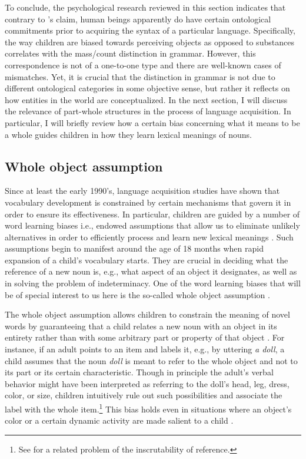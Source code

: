 To conclude, the psychological research reviewed in this section indicates that contrary to \citeauthor{quine1960word}'s claim, human beings apparently do have certain ontological commitments prior to acquiring the syntax of a particular language. Specifically, the way children are biased towards perceiving objects as opposed to substances correlates with the mass/count distinction in grammar. However, this correspondence is not of a one-to-one  type and there are well-known cases of mismatches. Yet, it is crucial that the distinction in grammar is not due to different ontological categories in some objective sense, but rather it reflects on how entities in the world are conceptualized. In the next section, I will discuss the relevance of part-whole structures in the process of language acquisition. In particular, I will briefly review how a certain bias concerning what it means to be a whole guides children in how they learn lexical meanings of nouns. 

\subsection{Whole object assumption}\label{sec:whole-object-assumption}

Since at least the early 1990's, language acquisition studies have shown that vocabulary development is constrained by certain mechanisms that govern it in order to ensure its effectiveness. In particular, children are guided by a number of word learning biases i.e., endowed assumptions that allow us to eliminate unlikely alternatives in order to efficiently process and learn new lexical meanings \citep[see, e.g.,][]{markman1990constraints,hollich_golinkoff_hirsh-pasek2007young,hansen_markman2009children}. Such assumptions begin to manifest around the age of 18 months when rapid expansion of a child's vocabulary starts. They are crucial in deciding what the reference of a new noun is, e.g., what aspect of an object it designates, as well as in solving the problem of indeterminacy. One of the word learning biases that will be of special interest to us here is the so-called whole object assumption \citep{markman1990constraints}. 

The whole object assumption allows children to constrain the meaning of novel words by guaranteeing that a child relates a new noun with an object in its entirety rather than with some arbitrary part or property of that object \citep{markman1990constraints}. For instance, if an adult points to an item and labels it, e.g., by uttering \textit{a doll}, a child assumes that the noun \textit{doll} is meant to refer to the whole object and not to its part or its certain characteristic. Though in principle the adult's verbal behavior might have been interpreted as referring to the doll's head, leg, dress, color, or size, children intuitively rule out such possibilities and associate the label with the whole item.\footnote{See \citet{quine1960word} for a related problem of the inscrutability of reference.} This bias holds even in situations where an object's color or a certain dynamic activity are made salient to a child \citep{hansen_markman2009children}.

